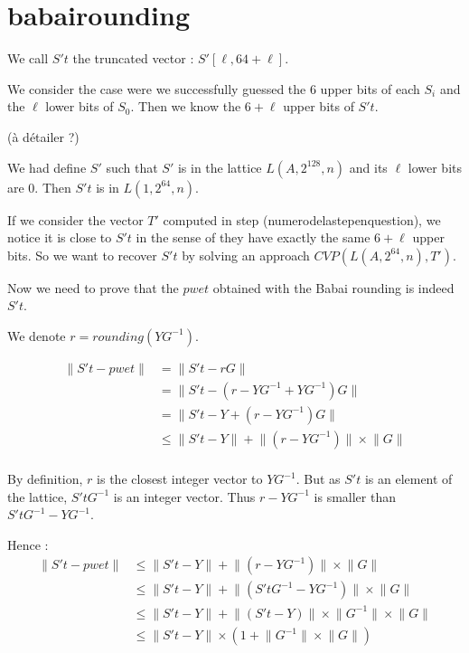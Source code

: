 \documentclass[preprint]{iacrtrans}
\begin{document}
\section{babairounding}

We call \(S't\) the truncated vector : \(S'[\ell,64+\ell]\).

We consider the case were we successfully guessed the 6 upper bits of each \(S_i\) and the \(\ell\) lower bits of \(S_0\). Then we know the \(6+\ell\) upper bits of \(S't\).

(à détailer ?)	

We had define \(S'\) such that \(S'\) is in the lattice \(L(A,2^{128},n)\) and its \(\ell \) lower bits are 0. Then \(S't\) is in \(L(1,2^{64},n)\).

If we consider the vector \(T'\) computed in step (numerodelastepenquestion), we notice it is close to \(S't\) in the sense of they have exactly the same \(6+\ell\) upper bits. So we want to recover \(S't\) by solving an approach \(CVP(L(A,2^{64},n),T')\).

Now we need to prove that the \(pwet\) obtained with the Babai rounding is indeed \(S't\).

We denote \(r = rounding(YG^{-1}) \).

\begin{align*}
\lVert S't - pwet \rVert &= \lVert S't - rG \rVert \\
&= \lVert S't - (r-YG^{-1} + YG^{-1})G \rVert\\
&= \lVert S't - Y + (r-YG^{-1})G \rVert\\
&\leqslant \lVert S't - Y \rVert + \lVert(r-YG^{-1})\rVert \times \lVert G\rVert\\	
\end{align*}

By definition, \(r\) is the closest integer vector to \(YG^{-1}\). But as \(S't\) is an element of the lattice, \(S'tG^{-1}\) is an integer vector. Thus \(r-YG^{-1}\) is smaller than \(S'tG^{-1}-YG^{-1}\).

Hence :
\begin{align*}
\lVert S't - pwet \rVert &\leqslant \lVert S't - Y \rVert + \lVert(r-YG^{-1})\rVert \times \lVert G\rVert\\	
&\leqslant \lVert S't - Y \rVert + \lVert(S'tG^{-1}-YG^{-1})\rVert \times \lVert G\rVert\\	
&\leqslant \lVert S't - Y \rVert + \lVert(S't-Y)\rVert \times \lVert G^{-1} \rVert  \times \lVert G\rVert\\
& 	\leqslant \lVert S't - Y \rVert \times (1 +\lVert G^{-1} \rVert  \times \lVert G\rVert )\\
\end{align*}
\end{document}
